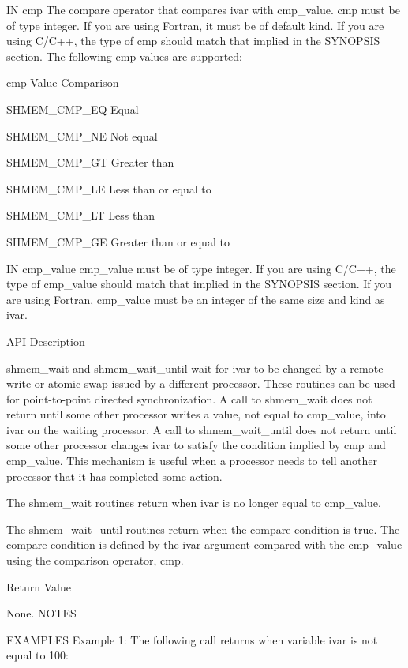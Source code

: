        IN	cmp     The  compare  operator  that compares ivar with cmp_value.  cmp
	       must be of type integer.	 If you are using Fortran, it must  be
	       of  default  kind.   If	you  are  using C/C++, the type of cmp
	       should  match  that  implied  in	 the  SYNOPSIS	section.   The
	       following cmp values are supported:

	       cmp Value	   Comparison

	       SHMEM_CMP_EQ	   Equal

	       SHMEM_CMP_NE	   Not equal

	       SHMEM_CMP_GT	   Greater than

	       SHMEM_CMP_LE	   Less than or equal to

	       SHMEM_CMP_LT	   Less than

	       SHMEM_CMP_GE	   Greater than or equal to

       IN	cmp_value
	       cmp_value must be of type integer.  If you are using C/C++, the
	       type of cmp_value should match that  implied  in	 the  SYNOPSIS
	       section.	  If  you  are	using  Fortran,	 cmp_value  must be an
	       integer of the same size and kind as ivar.

API Description

       shmem_wait and shmem_wait_until wait for ivar to be changed by a remote
       write or atomic swap issued by a different processor.   These  routines
       can  be	used  for  point-to-point directed synchronization.  A call to
       shmem_wait does not return until some other processor writes  a	value,
       not  equal to cmp_value, into ivar on the waiting processor.  A call to
       shmem_wait_until does not return until  some  other  processor  changes
       ivar  to	 satisfy  the  condition  implied  by cmp and cmp_value.  This
       mechanism is useful when a processor needs to  tell  another  processor
       that it has completed some action.

       The shmem_wait  routines	 return	 when  ivar  is	 no  longer  equal  to
       cmp_value.

       The  shmem_wait_until  routines	return	when  the compare condition is
       true.  The compare condition is defined by the ivar  argument  compared
       with the cmp_value using the comparison operator, cmp.

Return Value

	None.
NOTES


EXAMPLES
       Example	1:  The following call returns when variable ivar is not equal
       to 100:

